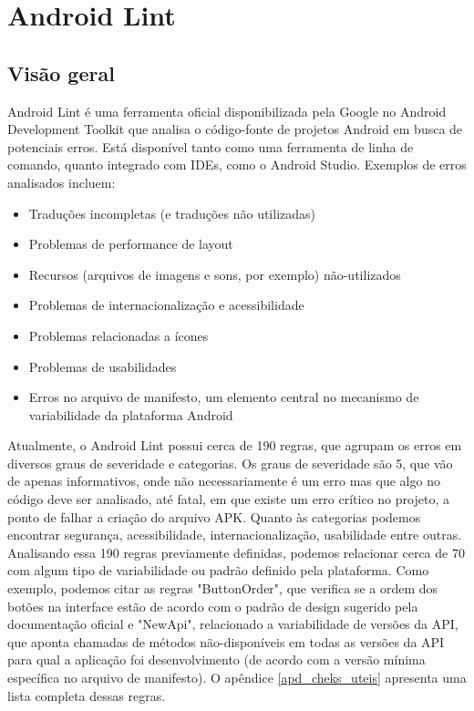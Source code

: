 \chapter{Android Lint}
\label{android_lint}
\section{Visão geral}

Android Lint é uma ferramenta oficial disponibilizada pela Google no Android 
Development Toolkit que analisa o código-fonte de projetos Android em busca de 
potenciais erros. Está disponível tanto como uma ferramenta de linha de comando, 
quanto integrado com IDEs, como o Android Studio. Exemplos de erros analisados incluem:

\begin{itemize}
  \item{Traduções incompletas (e traduções não utilizadas)}
  \item{Problemas de performance de layout}
  \item{Recursos (arquivos de imagens e sons, por exemplo) não-utilizados}
  \item{Problemas de internacionalização e acessibilidade}
  \item{Problemas relacionadas a ícones}
  \item{Problemas de usabilidades}
  \item{Erros no arquivo de manifesto, um elemento central no mecanismo de variabilidade
  da plataforma Android \cite{mechanisms}}
\end{itemize}

Atualmente, o Android Lint possui cerca de 190 regras, que agrupam os erros em 
diversos graus de severidade e categorias. Os graus de severidade são 5, que vão 
de apenas informativos, onde não necessariamente é um erro mas que algo no código 
deve ser analisado, até fatal, em que existe um erro crítico no projeto, a ponto 
de falhar a criação do arquivo APK. Quanto às categorias podemos encontrar segurança, 
acessibilidade, internacionalização, usabilidade entre outras. Analisando essa 190 
regras previamente definidas, podemos relacionar cerca de 70 com algum tipo de 
variabilidade ou padrão definido pela plataforma. Como exemplo, podemos citar as 
regras "ButtonOrder", que verifica se a ordem dos botões na interface estão de 
acordo com o padrão de design sugerido pela documentação oficial e "NewApi", 
relacionado a variabilidade de versões da API, que aponta chamadas de métodos 
não-disponíveis em todas as versões da API para qual a aplicação foi desenvolvimento 
(de acordo com a versão mínima específica no arquivo de manifesto). O apêndice 
\ref{apd_cheks_uteis} apresenta uma lista completa dessas regras. 

